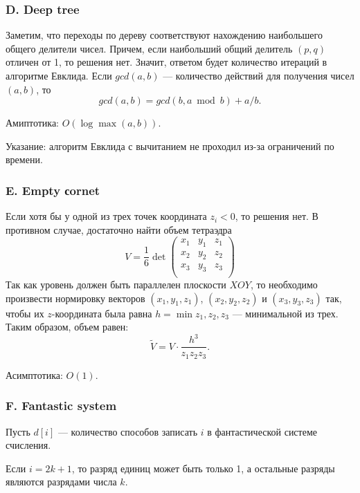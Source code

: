 \subsubsection*{D. Deep tree} 


Заметим, что переходы по дереву соответствуют нахождению наибольшего общего делители чисел. Причем, если наибольший общий делитель $(p, q)$ отличен от 1, то решения нет. Значит, ответом будет количество итераций в алгоритме Евклида. Если $gcd(a, b)$ --- количество действий для получения чисел $(a, b)$, то
$$gcd(a, b) = gcd(b, a \bmod b) + a / b.$$

Амиптотика: $O(\log{\max(a, b)})$.

Указание: алгоритм Евклида с вычитанием не проходил из-за ограничений по времени.



\subsubsection*{E. Empty сornet} 


Если хотя бы у одной из трех точек координата $z_i < 0$, то решения нет. В противном случае, достаточно найти объем тетраэдра
$$V = \frac{1}{6} \det
\begin{pmatrix}
x_1 & y_1 & z_1 \\
x_2 & y_2 & z_2 \\
x_3 & y_3 & z_3 \\
\end{pmatrix}
$$
Так как уровень должен быть параллелен плоскости $XOY$, то необходимо произвести нормировку векторов $(x_1, y_1, z_1)$, $(x_2, y_2, z_2)$ и $(x_3, y_3, z_3)$ так, чтобы их $z$-координата была равна $h = \min{z_1, z_2, z_3}$ --- минимальной из трех. Таким образом, объем равен:
$$\tilde{V} = V \cdot \frac{h^3}{z_1 z_2 z_3}.$$

Асимптотика: $O(1)$.



\subsubsection*{F. Fantastic system} 


Пусть $d[i]$ --- количество способов записать $i$ в фантастической системе счисления. 	

Если $i = 2 k + 1$, то разряд единиц может быть только 1, а остальные разряды являются разрядами числа $k$. 


